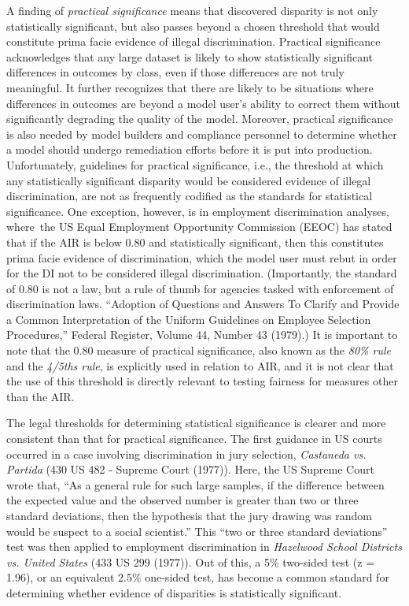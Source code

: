\documentclass[information,article,accept,moreauthors,pdftex]{Definitions/mdpi}
\begin{document}
A finding of \textit{practical significance} means that discovered disparity is not only statistically significant, but also passes beyond a chosen threshold that would constitute {prima facie} evidence of illegal discrimination.  Practical significance acknowledges that any large dataset is likely to show statistically significant differences in outcomes by class, even if those differences are not truly meaningful.  It further recognizes that there are likely to be situations where differences in outcomes are beyond a model user’s ability to correct them without significantly degrading the quality of the model. Moreover, practical significance is also needed by model builders and compliance personnel to determine whether a model should undergo remediation efforts before it is put into production. Unfortunately, guidelines for practical significance, i.e., the threshold at which any statistically significant disparity would be considered evidence of illegal discrimination, are not as frequently codified as the standards for statistical significance.  One exception, however, is in employment discrimination analyses, where~the US Equal Employment Opportunity Commission (EEOC) has stated that if the AIR is below 0.80 and statistically significant, then this constitutes {prima facie} evidence of discrimination, which the model user must rebut in order for the DI not to be considered illegal discrimination. (Importantly, the standard of 0.80 is not a law, but a rule of thumb for agencies tasked with enforcement of discrimination laws.  ``Adoption of Questions and Answers To Clarify and Provide a Common Interpretation of the Uniform Guidelines on Employee Selection Procedures,'' Federal Register, Volume 44, Number 43 (1979).) It is important to note that the 0.80 measure of practical significance, also known as the \textit{80\% rule} and the \textit{4/5ths rule}, is explicitly used in relation to AIR, and it is not clear that the use of this threshold is directly relevant to testing fairness for measures other than the AIR.

The legal thresholds for determining statistical significance is clearer and more consistent than that for practical significance.  The first guidance in US courts occurred in a case involving discrimination in jury selection, \textit{Castaneda vs. Partida} (430 US 482 - Supreme Court (1977)). Here, the US Supreme Court wrote that, ``As a general rule for such large samples, if the difference between the expected value and the observed number is greater than two or three standard deviations, then the hypothesis that the jury drawing was random would be suspect to a social scientist.''  This ``two or three standard deviations'' test was then applied to employment discrimination in \textit{Hazelwood School Districts vs. United States} (433 US 299 (1977)). Out of this, a 5\% two-sided test (z = 1.96), or an equivalent 2.5\% one-sided test, has become a common standard for determining whether evidence of disparities is statistically significant.
\end{document}
